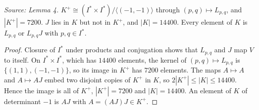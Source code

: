 \begin{theorem}
  \label{thm:finite-symmetry-group}
  \leanok
  \textit{Source: Lemma 4.}
  \(K^+\cong(I^*\times I^*)/\langle(-1,-1)\rangle\) through
  \((p,q)\mapsto L_{p,q}\), and \(|K^+|=7200\). \(J\) lies in \(K\) but not
  in \(K^+\), and \(|K|=14400\). Every element of \(K\) is \(L_{p,q}\) or
  \(L_{p,q}J\) with \(p,q\in I^*\).
\end{theorem}
\begin{proof}
  \leanok
  Closure of \(I^*\) under products and conjugation shows that
  \(L_{p,q}\) and \(J\) map \(V\) to itself. On \(I^*\times I^*\), which has
  \(14400\) elements, the kernel of \((p,q)\mapsto L_{p,q}\) is
  \(\{(1,1),(-1,-1)\}\), so its image in \(K^+\) has \(7200\) elements. The
  maps \(A\mapsto A\) and \(A\mapsto AJ\) embed two disjoint copies of
  \(K^+\) in \(K\), so \(2|K^+|\le|K|\le14400\). Hence the image is all of
  \(K^+\), \(|K^+|=7200\) and \(|K|=14400\). An element of \(K\) of
  determinant \(-1\) is \(AJ\) with \(A=(AJ)J\in K^+\).
\end{proof}
